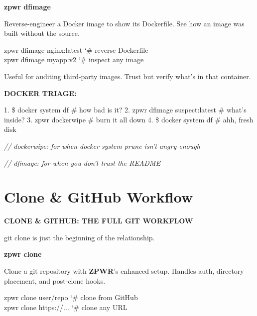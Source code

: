 \documentclass[11pt,a4paper,twoside]{book}
\begin{document}
\vspace{12pt}
{\bfseries\color{neonyellow} zpwr dfimage}\vspace{4pt}

Reverse-engineer a Docker image to show its Dockerfile. See how an image was built without the source.

\begin{codebox}
\color{neongreen}zpwr dfimage nginx:latest   {\char`\#} reverse Dockerfile\\
\color{neongreen}zpwr dfimage myapp:v2       {\char`\#} inspect any image\\
\end{codebox}

Useful for auditing third-party images. Trust but verify what's in that container.


\vspace{12pt}
{\bfseries\color{neonyellow} DOCKER TRIAGE:}\vspace{4pt}

1. \$ docker system df              \# how bad is it? 2. zpwr dfimage suspect:latest   \# what's inside? 3. zpwr dockerwipe               \# burn it all down 4. \$ docker system df              \# ahh, fresh disk

{\small\itshape\color{dimtext} // dockerwipe: for when docker system prune isn't angry enough}

{\small\itshape\color{dimtext} // dfimage: for when you don't trust the README}


\vspace{16pt}

\section{Clone \& GitHub Workflow}


\vspace{10pt}
{\large\bfseries\color{neoncyan} CLONE \& GITHUB: THE FULL GIT WORKFLOW}\vspace{6pt}

git clone is just the beginning of the relationship.


\vspace{12pt}
{\bfseries\color{neonyellow} zpwr clone}\vspace{4pt}

Clone a git repository with \textbf{ZPWR}'s enhanced setup. Handles auth, directory placement, and post-clone hooks.

\begin{codebox}
\color{neongreen}zpwr clone user/repo         {\char`\#} clone from GitHub\\
\color{neongreen}zpwr clone https://...       {\char`\#} clone any URL\\
\end{codebox}
\end{document}
